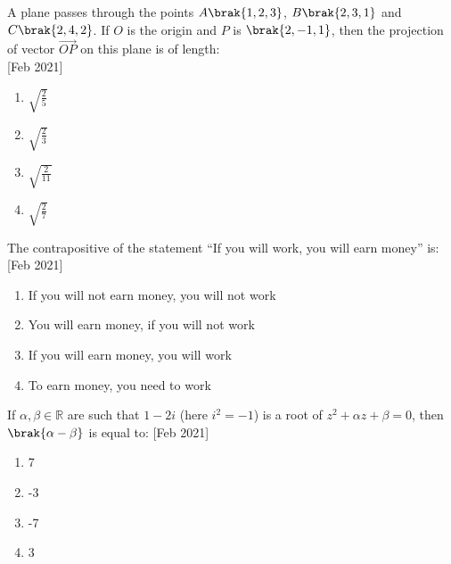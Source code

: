 \iffalse
\title{Assignment}
\author{ee24btech11059}
\section{mcq-single}
\fi

    \item{
          	A plane passes through the points $A\brak{1,2,3}$, $B\brak{2,3,1}$ and $C\brak{2,4,2}$. If $O$ is the origin and $P$ is $\brak{2,-1,1}$, then the projection of vector $\overrightarrow{OP}$ on this plane is of length:\\ \text{  }\hfill
                {[Feb 2021]}
            \begin{multicols}{4}
				\begin{enumerate}
					\item $\sqrt{\frac{2}{5}}$
					
					\item $\sqrt{\frac{2}{3}}$
					
					\item $\sqrt{\frac{2}{11}}$
					
					\item $\sqrt{\frac{2}{7}}$
				\end{enumerate}
			\end{multicols}
            }
    \item{
           	The contrapositive of the statement “If you will work, you will earn money” is: \\ \text{ }\hfill
                {[Feb 2021]}
                \begin{enumerate}
                   	\item If you will not earn money, you will not work
                   	\item You will earn money, if you will not work
                   	\item If you will earn money, you will work
                   	\item To earn money, you need to work
                \end{enumerate}
        }
\item{
        	
        	If $\alpha, \beta \in \mathbb{R}$ are such that $1 - 2i$ (here $i^2 = -1$) is a root of $z^2 + \alpha z + \beta = 0$, then $\brak{\alpha - \beta}$ is equal to:
        	\hfill
        	{[Feb 2021]}
        	\begin{multicols}{4}
        		\begin{enumerate}
        			\item 7
        			\item -3
        			\item -7
        			\item 3
        		\end{enumerate}
        	\end{multicols}
        	
        }
